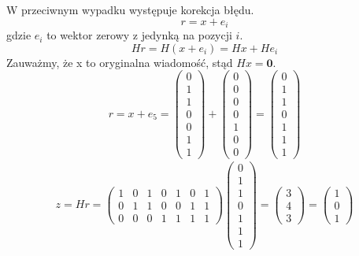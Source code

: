 W przeciwnym wypadku występuje korekcja błędu.
\[
    r = x + e_i
\]
gdzie $e_i$ to wektor zerowy z jedynką na pozycji $i$.
\[
    Hr=H(x+e_i)=Hx+He_i
\]
Zauważmy, że x to oryginalna wiadomość, stąd $Hx=\mathbf{0}$.
\[
    r=x+e_5=
    \begin{pmatrix}
        0 \\
        1 \\
        1 \\
        0 \\
        0 \\
        1 \\
        1
    \end{pmatrix}+
    \begin{pmatrix}
        0 \\
        0 \\
        0 \\
        0 \\
        1 \\
        0 \\
        0
    \end{pmatrix}=
    \begin{pmatrix}
        0 \\
        1 \\
        1 \\
        0 \\
        1 \\
        1 \\
        1
    \end{pmatrix}
\]
\begin{align*}
    z=Hr=\begin{pmatrix}
             1 & 0 & 1 & 0 & 1 & 0 & 1 \\
             0 & 1 & 1 & 0 & 0 & 1 & 1 \\
             0 & 0 & 0 & 1 & 1 & 1 & 1
    \end{pmatrix}
    \begin{pmatrix}
        0 \\
        1 \\
        1 \\
        0 \\
        1 \\
        1 \\
        1
    \end{pmatrix}=
    \begin{pmatrix}
        3 \\
        4 \\
        3
    \end{pmatrix}=
    \begin{pmatrix}
        1 \\
        0 \\
        1
    \end{pmatrix}
\end{align*}

